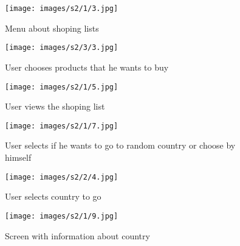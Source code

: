 \begin{figure}[H]
	\centering
	\texttt{[image: images/s2/1/3.jpg]}
	\caption{ Menu about shoping lists}
	\label{s2:lists}
\end{figure}

\begin{figure}[H]
	\centering
	\texttt{[image: images/s2/3/3.jpg]}
	\caption{User chooses products that he wants to buy}
	\label{s2:with}
\end{figure}

\begin{figure}[H]
	\centering
	\texttt{[image: images/s2/1/5.jpg]}
	\caption{User views the shoping list}
	\label{s2:shoplist}
\end{figure}

\begin{figure}[H]
	\centering
	\texttt{[image: images/s2/1/7.jpg]}
	\caption{User selects if he wants to go to random country or choose by himself}
	\label{s2:countrylist}
\end{figure}

\begin{figure}[H]
	\centering
	\texttt{[image: images/s2/2/4.jpg]}
	\caption{User selects country to go}
	\label{s2:selectcountry}
\end{figure}


\begin{figure}[H]
	\centering
	\texttt{[image: images/s2/1/9.jpg]}
	\caption{Screen with information about country}
	\label{s2:end}
\end{figure}